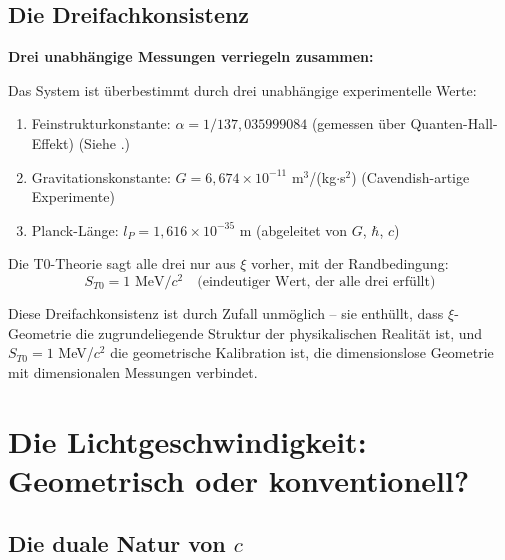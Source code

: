 	\subsection{Die Dreifachkonsistenz}
	
	\begin{insight}
		\textbf{Drei unabhängige Messungen verriegeln zusammen:}
		
		Das System ist überbestimmt durch drei unabhängige experimentelle Werte:
		\begin{enumerate}
			\item Feinstrukturkonstante: $\alpha = 1/137{,}035999084$ (gemessen über Quanten-Hall-Effekt) (Siehe \cite{Feinstrukturkonstante_De}.)
			\item Gravitationskonstante: $G = 6{,}674 \times 10^{-11}$ m$^3$/(kg$\cdot$s$^2$) (Cavendish-artige Experimente)
			\item Planck-Länge: $l_P = 1{,}616 \times 10^{-35}$ m (abgeleitet von $G$, $\hbar$, $c$)
		\end{enumerate}
		
		Die T0-Theorie sagt alle drei nur aus $\xi$ vorher, mit der Randbedingung:
		\begin{equation}
			S_{T0} = 1 \text{ MeV}/c^2 \quad \text{(eindeutiger Wert, der alle drei erfüllt)}
		\end{equation}
		
		Diese Dreifachkonsistenz ist durch Zufall unmöglich -- sie enthüllt, dass $\xi$-Geometrie die zugrundeliegende Struktur der physikalischen Realität ist, und $S_{T0} = 1$ MeV/$c^2$ die geometrische Kalibration ist, die dimensionslose Geometrie mit dimensionalen Messungen verbindet.
	\end{insight}
	
	\section{Die Lichtgeschwindigkeit: Geometrisch oder konventionell?}
	
	\subsection{Die duale Natur von $c$}
	
